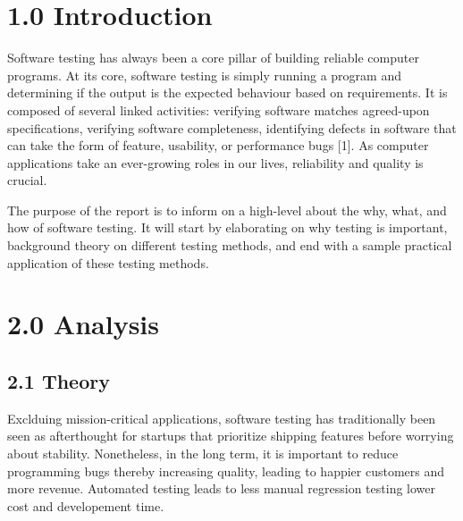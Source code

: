 \documentclass[12pt]{report}
\begin{document}
\section*{1.0 Introduction}
\par\indent
Software testing has always been a core pillar of building reliable computer programs. At its core, software testing is simply running a program and determining if the output is the expected behaviour based on requirements. It is composed of several linked activities: verifying software matches agreed-upon specifications, verifying software completeness, identifying defects in software that can take the form of feature, usability, or performance bugs [1]. As computer applications take an ever-growing roles in our lives, reliability and quality is crucial. \\ \par\noindent
The purpose of the report is to inform on a high-level about the why, what, and how of software testing. It will start by elaborating on why testing is important, background theory on different testing methods, and end with a sample practical application of these testing methods.

\newpage\thispagestyle{fancy}\sectionfont{\scshape}
\section*{2.0 Analysis}
\subsection*{2.1 Theory}
\noindent
Exclduing mission-critical applications, software testing has traditionally been seen as afterthought for startups that prioritize shipping features before worrying about stability. Nonetheless, in the long term, it is important to reduce programming bugs thereby increasing quality, leading to happier customers and more revenue. Automated testing leads to less manual regression testing lower cost and developement time.
\end{document}
